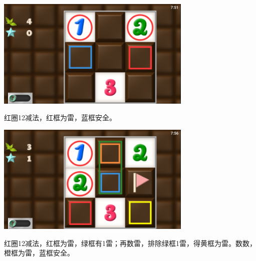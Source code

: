 \subsection{} %
\begin{center}
    \includegraphics[width=0.7\textwidth]{puzzle/11-1.png}
\end{center}
红圈12减法，红框为雷，蓝框安全。
\begin{center}
    \includegraphics[width=0.7\textwidth]{puzzle/11-2.png}
\end{center}
红圈12减法，红框为雷，绿框有1雷；再数雷，排除绿框1雷，得黄框为雷。数数，橙框为雷，蓝框安全。

